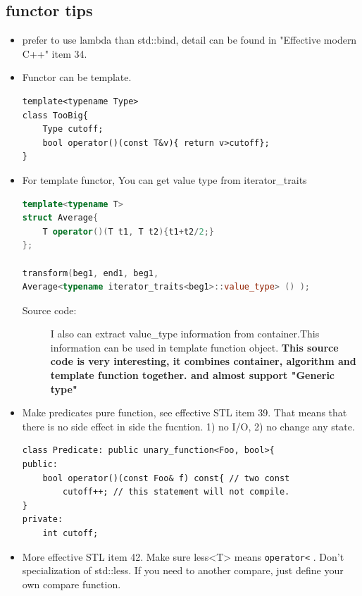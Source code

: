 \documentclass[a4paper,11pt,twoside]{book}
\begin{document}
\subsection{functor tips}

\begin{itemize}

	\item prefer to use lambda than std::bind, detail can be found in "Effective modern C++" item 34.

\item Functor can be template.
\begin{lstlisting}[numbers=none]
template<typename Type>
class TooBig{
	Type cutoff;
	bool operator()(const T&v){ return v>cutoff};
}
\end{lstlisting}

\item For template functor, You can get value type from iterator\_traits
\begin{lstlisting}[frame=single, language=c++]
template<typename T>
struct Average{
	T operator()(T t1, T t2){t1+t2/2;}
};

transform(beg1, end1, beg1,
Average<typename iterator_traits<beg1>::value_type> () );
\end{lstlisting}
\begin{description}
	\item[Source code:] I also can extract value\_type information from container.This information can be used in template function object. \textbf{This source code is very interesting, it combines container, algorithm and template function together. and almost support "Generic type"}
\end{description}



\item Make predicates pure function, see effective STL item 39. That means that there is no side effect in side the fucntion. 1) no I/O, 2) no change any state.
\begin{lstlisting}[numbers=none]
class Predicate: public unary_function<Foo, bool>{
public:
	bool operator()(const Foo& f) const{ // two const
		cutoff++; // this statement will not compile.
}
private:
	int cutoff;
\end{lstlisting}


\item More effective STL item 42. Make sure less<T> means \texttt{operator<} . Don't specialization of std::less. If you need to another compare, just define your own compare function.
\end{itemize}
\end{document}
